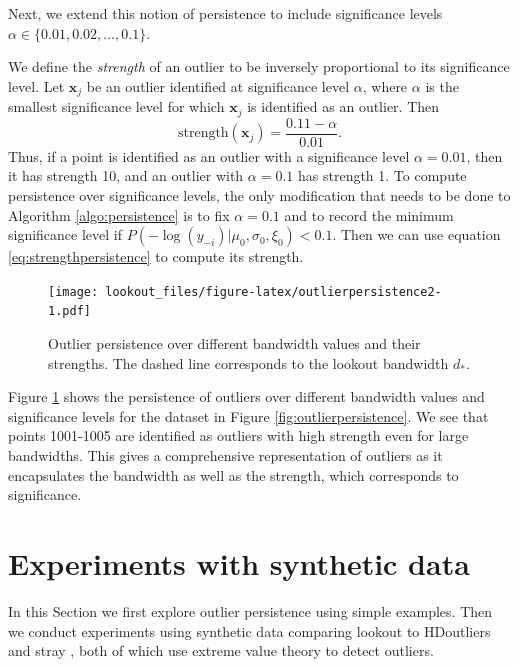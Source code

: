 \documentclass[11pt,a4paper,]{article}
\theoremstyle{definition}
\theoremstyle{definition}
\theoremstyle{definition}
\theoremstyle{remark}
\begin{document}
Next, we extend this notion of persistence to include significance levels \(\alpha \in \{0.01, 0.02, \dots, 0.1 \}\).

We define the \emph{strength} of an outlier to be inversely proportional to its significance level. Let \(\bm{x}_j\) be an outlier identified at significance level \(\alpha\), where \(\alpha\) is the smallest significance level for which \(\bm{x}_j\) is identified as an outlier. Then
\begin{equation}\label{eq:strengthpersistence}
    \text{strength} (\bm{x}_j) = \frac{0.11 - \alpha}{0.01} .
\end{equation}
Thus, if a point is identified as an outlier with a significance level \(\alpha = 0.01\), then it has strength 10, and an outlier with \(\alpha = 0.1\) has strength 1. To compute persistence over significance levels, the only modification that needs to be done to Algorithm \ref{algo:persistence} is to fix \(\alpha = 0.1\) and to record the minimum significance level if \(P\left(-\log(y_{-i})|\mu_0, \sigma_0, \xi_0 \right) < 0.1\).
Then we can use equation \eqref{eq:strengthpersistence} to compute its strength.

\begin{figure}
\centering
\texttt{[image: lookout\_files/figure-latex/outlierpersistence2-1.pdf]}
\caption{\label{fig:outlierpersistence2}Outlier persistence over different bandwidth values and their strengths. The dashed line corresponds to the lookout bandwidth \(d_*\).}
\end{figure}

Figure \ref{fig:outlierpersistence2} shows the persistence of outliers over different bandwidth values and significance levels for the dataset in Figure \ref{fig:outlierpersistence}. We see that points 1001-1005 are identified as outliers with high strength even for large bandwidths. This gives a comprehensive representation of outliers as it encapsulates the bandwidth as well as the strength, which corresponds to significance.

\hypertarget{sec:simulations}{%
\section{Experiments with synthetic data}\label{sec:simulations}}

In this Section we first explore outlier persistence using simple examples. Then we conduct experiments using synthetic data comparing lookout to HDoutliers \autocite{wilkinson2017visualizing} and stray \autocite{stray}, both of which use extreme value theory to detect outliers.
\end{document}
